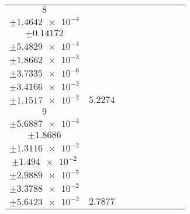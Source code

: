 \documentclass[8pt]{article}
\begin{document}
\begin{longtable}[l]{c c c c c c c c c}
$\num{8}$ & \begin{tabular}[c]{@{}c@{}}$\num{5.9912e-2}$ \\ $\pm\num{1.4642e-4}$\end{tabular} & \begin{tabular}[c]{@{}c@{}}$\num{-0.14155}$ \\ $\pm\num{0.14172}$\end{tabular} & \begin{tabular}[c]{@{}c@{}}$\num{10.344}$ \\ $\pm\num{5.4829e-4}$\end{tabular} & \begin{tabular}[c]{@{}c@{}}$\num{1.5763e+3}$ \\ $\pm\num{1.8662e-3}$\end{tabular} & \begin{tabular}[c]{@{}c@{}}$\num{3.1536}$ \\ $\pm\num{3.7335e-6}$\end{tabular} & \begin{tabular}[c]{@{}c@{}}$\num{1.1688}$ \\ $\pm\num{3.4166e-3}$\end{tabular} & \begin{tabular}[c]{@{}c@{}}$\num{4.1821}$ \\ $\pm\num{1.1517e-2}$\end{tabular} & $\num{5.2274}$\\
$\num{9}$ & \begin{tabular}[c]{@{}c@{}}$\num{4.1159e-2}$ \\ $\pm\num{5.6887e-4}$\end{tabular} & \begin{tabular}[c]{@{}c@{}}$\num{-1.5469}$ \\ $\pm\num{1.8686}$\end{tabular} & \begin{tabular}[c]{@{}c@{}}$\num{1.913}$ \\ $\pm\num{1.3116e-2}$\end{tabular} & \begin{tabular}[c]{@{}c@{}}$\num{1.5766e+3}$ \\ $\pm\num{1.494e-2}$\end{tabular} & \begin{tabular}[c]{@{}c@{}}$\num{3.1541}$ \\ $\pm\num{2.9889e-5}$\end{tabular} & \begin{tabular}[c]{@{}c@{}}$\num{3.2938}$ \\ $\pm\num{3.3788e-2}$\end{tabular} & \begin{tabular}[c]{@{}c@{}}$\num{5.9627}$ \\ $\pm\num{5.6423e-2}$\end{tabular} & $\num{2.7877}$\\

\end{longtable}
\end{document}
